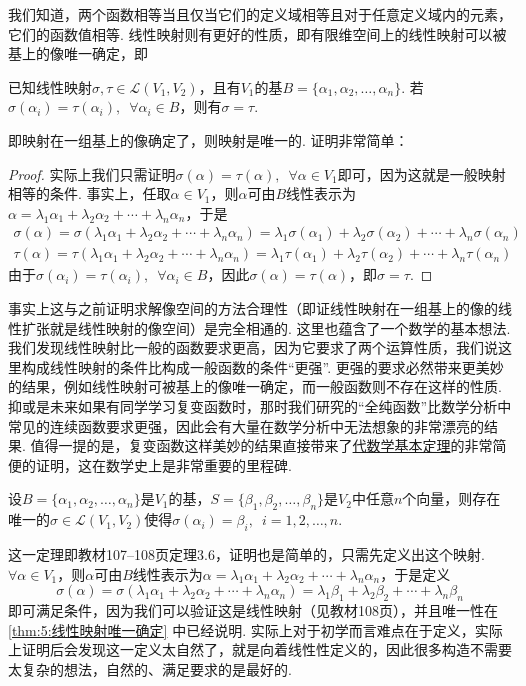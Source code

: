 我们知道，两个函数相等当且仅当它们的定义域相等且对于任意定义域内的元素，它们的函数值相等. 线性映射则有更好的性质，即有限维空间上的线性映射可以被基上的像唯一确定，即
\begin{theorem}\label{thm:5:线性映射唯一确定}
    已知线性映射$\sigma,\tau\in \mathcal{L}(V_1,V_2)$，且有$V_1$的基$B=\{\alpha_1,\alpha_2,\ldots,\alpha_n\}$. 若$\sigma(\alpha_i)=\tau(\alpha_i),\enspace\forall \alpha_i \in B$，则有$\sigma=\tau$.
\end{theorem}
即映射在一组基上的像确定了，则映射是唯一的. 证明非常简单：

\begin{proof}
    实际上我们只需证明$\sigma(\alpha)=\tau(\alpha),\enspace\forall \alpha \in V_1$即可，因为这就是一般映射相等的条件. 事实上，任取$\alpha \in V_1$，则$\alpha$可由$B$线性表示为$\alpha=\lambda_1\alpha_1+\lambda_2\alpha_2+\cdots+\lambda_n\alpha_n$，于是
    \begin{gather*}
        \sigma(\alpha)=\sigma(\lambda_1\alpha_1+\lambda_2\alpha_2+\cdots+\lambda_n\alpha_n)=\lambda_1\sigma(\alpha_1)+\lambda_2\sigma(\alpha_2)+\cdots+\lambda_n\sigma(\alpha_n) \\
        \tau(\alpha)=\tau(\lambda_1\alpha_1+\lambda_2\alpha_2+\cdots+\lambda_n\alpha_n)=\lambda_1\tau(\alpha_1)+\lambda_2\tau(\alpha_2)+\cdots+\lambda_n\tau(\alpha_n)
    \end{gather*}
    由于$\sigma(\alpha_i)=\tau(\alpha_i),\enspace\forall \alpha_i \in B$，因此$\sigma(\alpha)=\tau(\alpha)$，即$\sigma=\tau$.
\end{proof}

事实上这与之前证明求解像空间的方法合理性（即证线性映射在一组基上的像的线性扩张就是线性映射的像空间）是完全相通的. 这里也蕴含了一个数学的基本想法. 我们发现线性映射比一般的函数要求更高，因为它要求了两个运算性质，我们说这里构成线性映射的条件比构成一般函数的条件``更强''. 更强的要求必然带来更美妙的结果，例如线性映射可被基上的像唯一确定，而一般函数则不存在这样的性质. 抑或是未来如果有同学学习复变函数时，那时我们研究的``全纯函数''比数学分析中常见的连续函数要求更强，因此会有大量在数学分析中无法想象的非常漂亮的结果. 值得一提的是，复变函数这样美妙的结果直接带来了\hyperref[thm:17:代数学基本定理]{代数学基本定理}的非常简便的证明，这在数学史上是非常重要的里程碑.

\begin{theorem}\label{thm:5:线性映射构造}
    设$B=\{\alpha_1,\alpha_2,\ldots,\alpha_n\}$是$V_1$的基，$S=\{\beta_1,\beta_2,\ldots,\beta_n\}$是$V_2$中任意$n$个向量，则存在唯一的$\sigma\in \mathcal{L}(V_1,V_2)$使得$\sigma(\alpha_i)=\beta_i,\enspace i=1,2,\ldots,n$.
\end{theorem}
这一定理即教材107--108页定理3.6，证明也是简单的，只需先定义出这个映射. $\forall \alpha \in V_1$，则$\alpha$可由$B$线性表示为$\alpha=\lambda_1\alpha_1+\lambda_2\alpha_2+\cdots+\lambda_n\alpha_n$，于是定义
\[\sigma(\alpha)=\sigma(\lambda_1\alpha_1+\lambda_2\alpha_2+\cdots+\lambda_n\alpha_n)=\lambda_1\beta_1+\lambda_2\beta_2+\cdots+\lambda_n\beta_n\]
即可满足条件，因为我们可以验证这是线性映射（见教材108页），并且唯一性在\autoref{thm:5:线性映射唯一确定} 中已经说明. 实际上对于初学而言难点在于定义，实际上证明后会发现这一定义太自然了，就是向着线性性定义的，因此很多构造不需要太复杂的想法，自然的、满足要求的是最好的.

